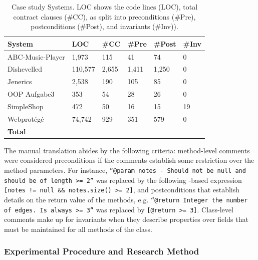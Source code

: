 \begin{table}[ht]
\caption{Case study Systems. LOC shows the code lines (LOC), total contract clauses (\#CC), as split
into preconditions (\#Pre), postconditions (\#Post), and invariants (\#Inv)).}
\label{tab:Units}
\centering
\begin{tabular}{llllll}
\toprule
\bfseries System &  \bfseries LOC & 
\bfseries \#CC &  \bfseries \#Pre &  \bfseries \#Post &
 \bfseries \#Inv \\ \hline
ABC-Music-Player & 1,973 & 115 & 41 & 74 & 0 \\ 
Dishevelled & 110,577 & 2,655 & 1,411 & 1,250 & 0 \\ 
Jenerics & 2,538 & 190 & 105 & 85 & 0 \\ 
OOP Aufgabe3 & 353 & 54 & 28 & 26 & 0 \\
SimpleShop & 472 & 50 & 16 & 15 & 19 \\
Webprot\'{e}g\'{e} & 74,742 & 929 & 351 & 579 & 0 \\ \hline

 \bfseries Total &  \bfseries \totalCode{} &  \bfseries
\totalClauses{} &  \bfseries \totalPre{} &  \bfseries \totalPost{} &
 \bfseries \totalInv{}
\\
\bottomrule
\end{tabular}
\end{table}

The manual translation abides by the following criteria: method-level comments were considered preconditions
if the comments establish some restriction over the method parameters.
For instance, \texttt{``@param notes - Should not be null and should be of length >= 2''} was
replaced by the following \contractjdoc{}-based expression \texttt{[notes != null \&\& notes.size() >= 2]}, and
postconditions that establish details on the return value of the
methods, e.g. \texttt{``@return Integer the number of edges. Is always >= 3''}
was replaced by \texttt{[@return >= 3]}. Class-level comments make up for
invariants when they describe properties over fields that must be maintained for
all methods of the class.

\subsubsection{Experimental Procedure and Research Method} 

